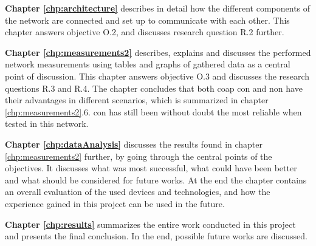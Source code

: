 \noindent \textbf{Chapter \ref{chp:architecture}} describes in detail how the different components of the network are connected and set up to communicate with each other. This chapter answers objective O.2, and discusses research question R.2 further. 

\noindent \textbf{Chapter \ref{chp:measurements2}} describes, explains and discusses the performed network measurements using tables and graphs of gathered data as a central point of discussion. This chapter answers objective O.3 and discusses the research questions R.3 and R.4. The chapter concludes that both \gls{coap} \gls{con} and \gls{non} have their advantages in different scenarios, which is summarized in chapter \ref{chp:measurements2}.6. \gls{con} has still been without doubt the most reliable when tested in this network. 

\noindent \textbf{Chapter \ref{chp:dataAnalysis}} discusses the results found in chapter \ref{chp:measurements2} further, by going through the central points of the objectives. It discusses what was most successful, what could have been better and what should be considered for future works. At the end the chapter contains an overall evaluation of the used devices and technologies, and how the experience gained in this project can be used in the future. 

\noindent \textbf{Chapter \ref{chp:results}} summarizes the entire work conducted in this project and presents the final conclusion. In the end, possible future works are discussed. 





